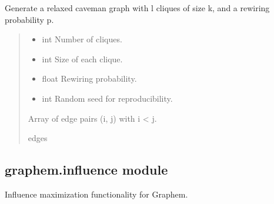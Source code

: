 \documentclass[letterpaper,10pt,english]{sphinxmanual}
\begin{document}
\begin{fulllineitems}
\label{\detokenize{api_reference:id32}}
\pysigstartsignatures
{}
\pysigstopsignatures
\sphinxAtStartPar
Generate a relaxed caveman graph with l cliques of size k,
and a rewiring probability p.
\begin{quote}\begin{description}
\begin{itemize}
\item {} 
\sphinxAtStartPar
{} \textendash{} int
Number of cliques.

\item {} 
\sphinxAtStartPar
{} \textendash{} int
Size of each clique.

\item {} 
\sphinxAtStartPar
{} \textendash{} float
Rewiring probability.

\item {} 
\sphinxAtStartPar
{} \textendash{} int
Random seed for reproducibility.

\end{itemize}

\sphinxAtStartPar
\begin{description}
\sphinxAtStartPar
Array of edge pairs (i, j) with i \textless{} j.

\end{description}


\sphinxAtStartPar
edges

\end{description}\end{quote}

\end{fulllineitems}



\subsection{graphem.influence module}
\label{\detokenize{api_reference:module-1}}\label{\detokenize{api_reference:graphem-influence-module}}
\sphinxAtStartPar
Influence maximization functionality for Graphem.
\end{document}
